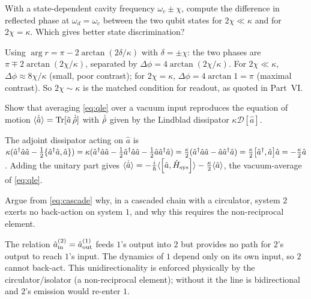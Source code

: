 \begin{exercise}
With a state-dependent cavity frequency $\omega_c\pm\chi$, compute
the difference in reflected phase at $\omega_d=\omega_c$ between the
two qubit states for $2\chi\ll\kappa$ and for $2\chi=\kappa$. Which
gives better state discrimination?
\begin{solution}
Using $\arg r=\pi-2\arctan(2\delta/\kappa)$ with $\delta=\pm\chi$:
the two phases are $\pi\mp2\arctan(2\chi/\kappa)$, separated by
$\Delta\phi=4\arctan(2\chi/\kappa)$. For $2\chi\ll\kappa$,
$\Delta\phi\approx8\chi/\kappa$ (small, poor contrast); for
$2\chi=\kappa$, $\Delta\phi=4\arctan1=\pi$ (maximal contrast). So
$2\chi\sim\kappa$ is the matched condition for readout, as quoted in
Part~VI.
\end{solution}
\end{exercise}

\begin{exercise}
Show that averaging \cref{eq:qle} over a vacuum input reproduces the
equation of motion $\langle\dot{\hat a}\rangle=\operatorname{Tr}[\hat a\,\dot{\hat{\rho}}]$
with $\dot{\hat{\rho}}$ given by the Lindblad dissipator
$\kappa\mathcal D[\hat a]$.
\begin{solution}
The adjoint dissipator acting on $\hat a$ is
$\kappa(\hat a^\dagger\hat a\hat a-\tfrac12\{\hat a^\dagger\hat a,\hat a\})
=\kappa(\hat a^\dagger\hat a\hat a-\tfrac12\hat a^\dagger\hat a\hat a-\tfrac12\hat a\hat a^\dagger\hat a)
=\tfrac{\kappa}2(\hat a^\dagger\hat a\hat a-\hat a\hat a^\dagger\hat a)
=\tfrac\kappa2\comm{\hat a^\dagger}{\hat a}\hat a=-\tfrac\kappa2\hat a$.
Adding the unitary part gives
$\langle\dot{\hat a}\rangle=-\tfrac i\hbar\langle\comm{\hat a}{\op H_{\rm sys}}\rangle-\tfrac\kappa2\langle\hat a\rangle$,
the vacuum-average of \cref{eq:qle}.
\end{solution}
\end{exercise}

\begin{exercise}
Argue from \cref{eq:cascade} why, in a cascaded chain with a
circulator, system $2$ exerts no back-action on system $1$, and why
this requires the non-reciprocal element.
\begin{solution}
The relation $\hat a_{\rm in}^{(2)}=\hat a_{\rm out}^{(1)}$ feeds
$1$'s output into $2$ but provides no path for $2$'s output to reach
$1$'s input. The dynamics of $1$ depend only on its own input, so
$2$ cannot back-act. This unidirectionality is enforced physically
by the circulator/isolator (a non-reciprocal element); without it
the line is bidirectional and $2$'s emission would re-enter $1$.
\end{solution}
\end{exercise}

